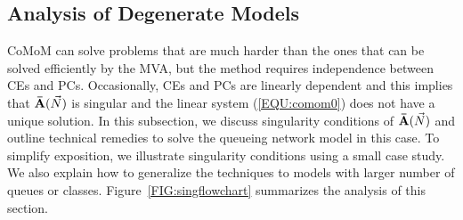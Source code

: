 \documentclass[journal,twocolumn,9.5pt]{IEEEtran}
\newtheorem{observation}{Observation}
\newcommand{\comom}[1]{\bar{#1}}
\begin{document}


\subsection{Analysis of Degenerate Models}
\label{SEC:degenerate}
CoMoM can solve problems that are much harder than the ones that can be solved efficiently by the MVA, but the method requires independence between CEs and PCs. Occasionally, CEs and PCs are linearly dependent and this implies that ${\bf \comom{A}}(\vec N)$ is singular and the linear system (\ref{EQU:comom0}) does not have a unique solution. In this subsection, we discuss singularity conditions of ${\bf \comom{A}}(\vec N)$ and outline technical remedies to solve the queueing network model in this case. To simplify exposition, we illustrate singularity conditions using a small case study. We also explain how to generalize the techniques to models with larger number of queues or classes. Figure~\ref{FIG:singflowchart} summarizes the analysis of this section.
\end{document}
